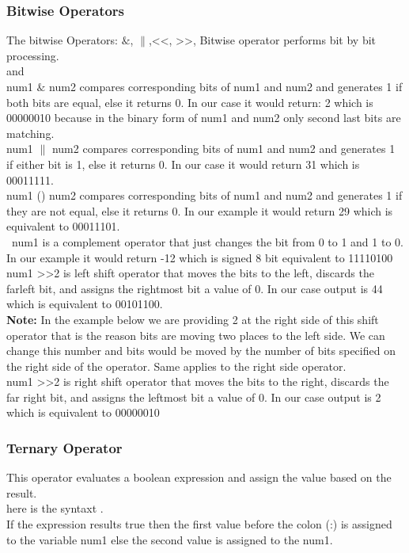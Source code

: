\documentclass[11pt, a4paper]{article}
\begin{document}
\subsubsection{Bitwise Operators}
The bitwise Operators: $\&$, $\|$,\textless\textless, \textgreater\textgreater,
Bitwise operator performs bit by bit processing.\\
 and \\
num1 $\&$ num2 compares corresponding bits of num1 and num2 and generates 1 if both bits
are equal, else it returns 0. In our case it would return: 2 which is 00000010 because
in the binary form of num1 and num2 only second last bits are matching.\\
num1 $\|$ num2 compares corresponding bits of num1 and num2 and generates 1 if either
bit is 1, else it returns 0. In our case it would return 31 which is 00011111.\\
num1 () num2 compares corresponding bits of num1 and num2 and generates 1 if they
are not equal, else it returns 0. In our example it would return 29 which is
equivalent to 00011101.\\
~num1 is a complement operator that just changes the bit from 0 to 1 and 1 to 0.
In our example it would return -12 which is signed 8 bit equivalent to 11110100\\
num1 \textgreater\textgreater 2 is left shift operator that moves the bits to the left,
discards the farleft bit, and assigns the rightmost bit a value of 0. In our case output is 44 which
is equivalent to 00101100.\\
\textbf{Note:} In the example below we are providing 2 at the right side of this shift operator
that is the reason bits are moving two places to the left side. We can change this
number and bits would be moved by the number of bits specified on the right side
of the operator. Same applies to the right side operator.\\
num1 \textgreater\textgreater 2 is right shift operator that moves the bits to the right, discards
the far right bit, and assigns the leftmost bit a value of 0. In our case
output is 2 which is equivalent to 00000010


\subsubsection{Ternary Operator}
This operator evaluates a boolean expression and assign the value based on the result.\\
here is the syntaxt
.\\
If the expression results true then the first value before the colon (:)
is assigned to the variable num1 else the second value is assigned to the num1.

\end{document}
